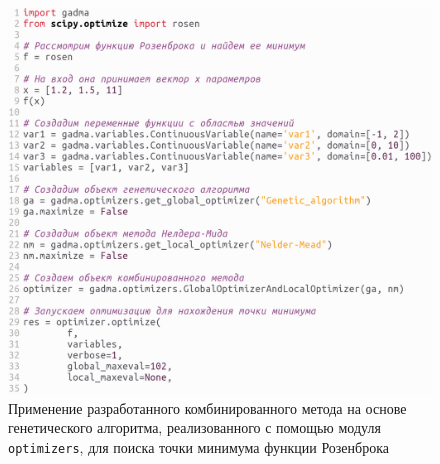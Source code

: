 \begin{figure}[ht]
    \centering
    \includegraphics[width=\linewidth]{images/part2/genetics_algorithm/example_run.png}
    \caption{Применение разработанного комбинированного метода на основе генетического алгоритма, реализованного с помощью модуля \texttt{optimizers}, для поиска точки минимума функции Розенброка}
    \label{fig:part2:ga_implementation:rosenbrock_ex}
\end{figure}

